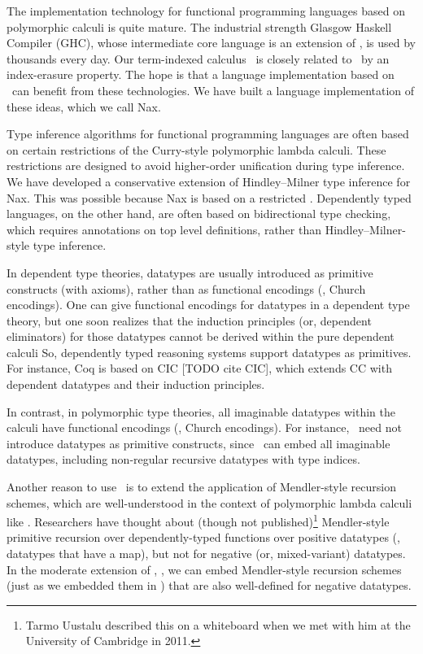 The implementation technology for functional programming languages based on
polymorphic calculi is quite mature. The industrial strength
Glasgow Haskell Compiler (GHC),
whose intermediate core language is an extension of \Fw, is used by thousands
every day.
Our term-indexed calculus \Fi\ is closely
related to \Fw\ by an index-erasure property. The hope is that
a language implementation based on \Fi\ can benefit from these technologies.
We have built a language implementation of these ideas, which we call Nax.

Type inference algorithms for functional programming languages are often
based on certain restrictions of the Curry-style polymorphic lambda calculi.
These restrictions are designed to avoid higher-order unification during type
inference. We have developed a conservative extension of Hindley--Milner
type inference for Nax. This was possible because Nax is based on a
restricted \Fi. Dependently typed languages, on the other hand, are
often based on bidirectional type checking, which requires annotations on
top level definitions, rather than Hindley--Milner-style type inference.

In dependent type theories, datatypes are usually introduced as
primitive constructs (with axioms), rather than as
functional encodings  (\eg, Church encodings). 
One can give functional encodings for datatypes in a dependent type theory,
but one soon realizes that the induction principles (or, dependent eliminators)
for those datatypes cannot be derived within the pure dependent calculi
\cite{Geuvers01}
So, dependently typed reasoning systems support datatypes as primitives.
For instance, Coq is based on CIC [TODO cite CIC], which extends
CC \cite{CoqHue86} with dependent datatypes and their induction principles.

In contrast, in polymorphic type theories, all imaginable datatypes
within the calculi have functional encodings (\eg, Church encodings).
For instance, \Fw\ need not introduce datatypes as primitive constructs,
since \Fw\ can embed all imaginable datatypes, including non-regular
recursive datatypes with type indices.

Another reason to use \Fi\ is to extend the application of 
Mendler-style recursion schemes, which are well-understood
in the context of polymorphic lambda calculi like \Fw.
Researchers have thought about (though not published)\footnote{
     Tarmo Uustalu described this on a whiteboard
     when we met with him at the University of Cambridge in 2011.}
Mendler-style primitive recursion over dependently-typed functions
over positive datatypes (\ie, datatypes that have a map), but not for
negative (or, mixed-variant) datatypes.
In the moderate extension of \Fw, \Fi, we can embed Mendler-style
recursion schemes (just as we embedded them in \Fw) that
are also well-defined for negative datatypes.

